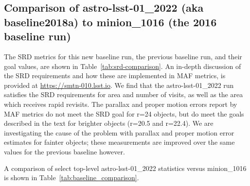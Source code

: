 \documentclass[DM,lsstdraft,authoryear,toc]{lsstdoc}
\begin{document}
\subsection{Comparison of astro-lsst-01\_2022 (aka baseline2018a) to minion\_1016 (the 2016 baseline run)}

The SRD metrics for this new baseline run, the previous baseline run, and their goal values, are shown in Table~\ref{tab:srd-comparison}. An in-depth discussion of the SRD requirements and how these are implemented in MAF metrics, is provided at \url{https://smtn-010.lsst.io}. We find that the astro-lsst-01\_2022 run satisfies the SRD requirements for area and number of visits, as well as the area which receives rapid revisits.  The parallax and proper motion errors report by MAF metrics do not meet the SRD goal for r=24 objects, but do meet the goals described in the text for brighter objects (r=20.5 and r=22.4). We are investigating the cause of the problem with parallax and proper motion error estimates for fainter objects; these measurements are improved over the same values for the previous baseline however.

A comparison of select top-level astro-lsst-01\_2022 statistics versus minion\_1016 is shown in Table~\ref{tab:baseline_comparison}. 
\end{document}
